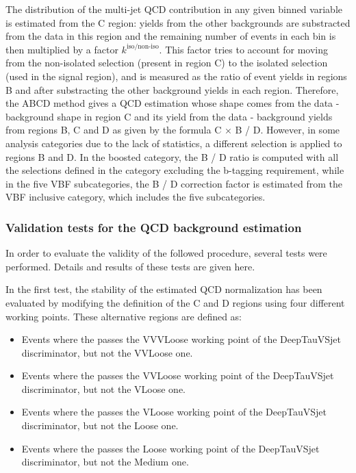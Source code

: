 \documentclass[../main.tex]{subfiles}
\begin{document}
The distribution of the multi-jet QCD contribution in any given binned variable is estimated from the C region: yields from the other backgrounds are substracted from the data in this region and the remaining number of events in each bin is then multiplied by a factor $k^{\text{iso/non-iso}}$. This factor tries to account for moving from the non-isolated selection (present in region C) to the isolated selection (used in the signal region), and is measured as the ratio of event yields in regions B and after substracting the other background yields in each region. Therefore, the ABCD method gives a QCD estimation whose shape comes from the data - background shape in region C and its yield from the data - background yields from regions B, C and D as given by the formula C $\times$ B / D. However, in some analysis categories due to the lack of statistics, a different selection is applied to regions B and D. In the boosted category, the B / D ratio is computed with all the selections defined in the category excluding the b-tagging requirement, while in the five VBF subcategories, the B / D correction factor is estimated from the VBF inclusive category, which includes the five subcategories.



\subsubsection{Validation tests for the QCD background estimation}
\label{hh:subsubsec:qcd_validation}

In order to evaluate the validity of the followed procedure, several tests were performed. Details and results of these tests are given here.

In the first test, the stability of the estimated QCD normalization has been evaluated by modifying the definition of the C and D regions using four different \deeptau{} working points. These alternative regions are defined as:
\begin{itemize}
\item Events where the \tauh{} passes the VVVLoose working point of the DeepTauVSjet discriminator, but not the VVLoose one.
\item Events where the \tauh{} passes the VVLoose working point of the DeepTauVSjet discriminator, but not the VLoose one.
\item Events where the \tauh{} passes the VLoose working point of the DeepTauVSjet discriminator, but not the Loose one.
\item Events where the \tauh{} passes the Loose working point of the DeepTauVSjet discriminator, but not the Medium one.
\end{itemize}
\end{document}
